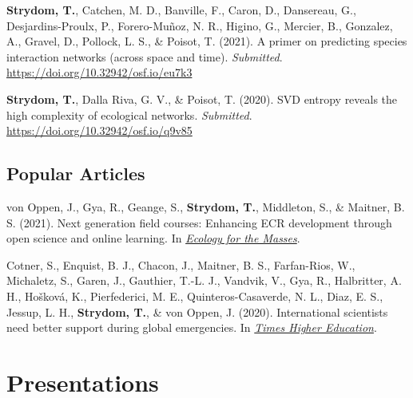 \documentclass[11pt, a4paper]{awesome-cv}
\begin{document}
\begingroup
\setlength{\parindent}{-0.5in}
\setlength{\leftskip}{0.5in}

\hypertarget{refs_review}{}
\leavevmode\hypertarget{ref-StrydomPriPre2021}{}%
\textbf{Strydom, T.}, Catchen, M. D., Banville, F., Caron, D., Dansereau, G., Desjardins-Proulx, P., Forero-Muñoz, N. R., Higino, G., Mercier, B., Gonzalez, A., Gravel, D., Pollock, L. S., \& Poisot, T. (2021). A primer on predicting species interaction networks (across space and time). \emph{Submitted}. \url{https://doi.org/10.32942/osf.io/eu7k3}

\leavevmode\hypertarget{ref-StrydomSVDEnt2020}{}%
\textbf{Strydom, T.}, Dalla Riva, G. V., \& Poisot, T. (2020). SVD entropy reveals the high complexity of ecological networks. \emph{Submitted}. \url{https://doi.org/10.32942/osf.io/q9v85}

\endgroup
\vspace{\baselineskip}

\hypertarget{popular-articles}{%
\subsection{\texorpdfstring{\textbf{Popular Articles}}{Popular Articles}}\label{popular-articles}}

\begingroup
\setlength{\parindent}{-0.5in}
\setlength{\leftskip}{0.5in}

\hypertarget{refs_popular}{}
\leavevmode\hypertarget{ref-NextGen2021}{}%
von Oppen, J., Gya, R., Geange, S., \textbf{Strydom, T.}, Middleton, S., \& Maitner, B. S. (2021). Next generation field courses: Enhancing ECR development through open science and online learning. In \emph{\href{https://ecologyforthemasses.com/2021/03/08/next-generation-field-courses-enhancing-ecr-development-through-open-science-and-online-learning/}{Ecology for the Masses}}.

\leavevmode\hypertarget{ref-peru2020}{}%
Cotner, S., Enquist, B. J., Chacon, J., Maitner, B. S., Farfan-Rios, W., Michaletz, S., Garen, J., Gauthier, T.-L. J., Vandvik, V., Gya, R., Halbritter, A. H., Hošková, K., Pierfederici, M. E., Quinteros-Casaverde, N. L., Diaz, E. S., Jessup, L. H., \textbf{Strydom, T.}, \& von Oppen, J. (2020). International scientists need better support during global emergencies. In \emph{\href{https://tinyurl.com/y5ccw9nb}{Times Higher Education}}.

\endgroup

\hypertarget{presentations}{%
\section{Presentations}\label{presentations}}
\end{document}
